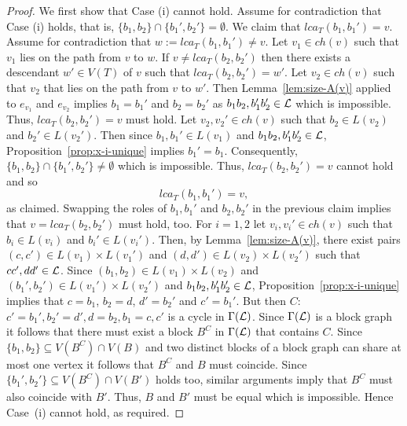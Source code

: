 \begin{proof}
We first show that Case (i) cannot hold. Assume for contradiction that
Case (i) holds, that is, $\{b_1,b_2\}\cap\{b_1',b_2'\}=\emptyset $.
We claim that 
$lca_T(b_1,b_1')=v$. Assume for contradiction that 
$w:=lca_T(b_1,b_1')\not=v$. Let $v_1\in ch(v)$ 
such that $v_1$ lies on the path from $v$ to
$w$. If $v\not =lca_T(b_2,b_2')$
then there exists a descendant $w'\in V(T)$ of $v$ such
that $lca_T(b_2,b_2')=w'$. Let $v_2\in ch(v)$ 
such that $v_2$ that lies on the path from $v$ to $w'$. Then
Lemma~\ref{lem:size-A(v)} applied to $e_{v_1}$ and $e_{v_2}$
implies $b_1=b_1'$ and $b_2=b_2'$ as $b_1b_2,b_1'b_2'\in {\mathcal L}$
which is impossible. Thus, $lca_T(b_2,b_2')=v$
must hold. Let $v_2,v_2'\in ch(v)$ such that $b_2\in L(v_2)$
and $b_2'\in L(v_2')$. 
Then since $b_1,b_1'\in L(v_1)$ and $b_1b_2, b_1'b_2'\in {\mathcal L}$, 
Proposition~\ref{prop:x-i-unique}
implies $b_1'=b_1$.
Consequently,
$\{b_1,b_2\}\cap\{b_1',b_2'\}\not=\emptyset $ which is impossible.
%
Thus, $lca_T(b_2,b_2')=v$
cannot hold and so 
$$
lca_T(b_1,b_1')=v,
$$ 
as claimed.
Swapping the roles of $b_1,b_1'$ and $b_2,b_2'$ in the previous
claim implies that 
 $v= lca_T(b_2,b_2')$ must hold, too. 
 For $i=1,2$ let $v_i,v_i'\in ch(v)$ 
such that $b_i\in L(v_i)$ and $b_i'\in L(v_i')$.
Then, by Lemma~\ref{lem:size-A(v)}, 
there exist pairs $(c,c')\in L(v_1)\times L(v_1')$ and 
$(d,d')\in L(v_2)\times L(v_2')$ such that $cc',dd'\in{\mathcal L}$. 
Since $(b_1,b_2)\in L(v_1)\times L(v_2)$ and 
$(b_1',b_2')\in L(v_1')\times L(v_2')$ and $b_1b_2,b_1'b_2'\in{\mathcal L}$,
 Proposition~\ref{prop:x-i-unique} implies 
that $c=b_1$, $b_2=d$, $d'=b_2'$ and $c'=b_1'$. But then
$C$: $c'=b_1',b_2'=d', d=b_2, b_1=c,c'$ is a cycle in $\Gamma({\mathcal L})$.
Since $\Gamma({\mathcal L})$ is a block graph it follows that there must exist
a block $B^C$ in $\Gamma({\mathcal L})$ that contains $C$. 
Since $\{b_1,b_2\}\subseteq V(B^C)\cap V(B)$ and two distinct blocks of
a block graph can share at most one vertex it follows that $B^C$ and 
$B$ must coincide. Since $\{b_1',b_2'\}\subseteq V(B^C)\cap V(B')$
holds too,
similar arguments imply that $B^C$ must also coincide with $B'$.
Thus, $B$ and $B'$ must be equal which is impossible.
Hence Case~(i) cannot hold, as required.


\end{proof}

